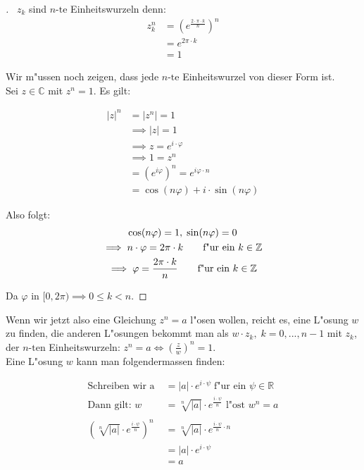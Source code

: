 \documentclass[11pt]{article}
\theoremstyle{remark}
\theoremstyle{definition}
\theoremstyle{remark}
\begin{document}
\begin{proof}[] \label{} \
\(z_k\) sind \(n\text{-te}\) Einheitswurzeln denn:
\begin{align*}
z_k^n & = (e^{\frac{2\cdot\pi\cdot k}{n}})^n \\ 
& = e^{2\pi\cdot k} \\
& = 1
\end{align*}


Wir m"ussen noch zeigen, dass jede \(n\text{-te}\) Einheitswurzel von dieser Form
ist. \\

Sei \(z\in\mathbb{C}\) mit \(z^n=1\). Es gilt:

\begin{align*}
|z|^n & =|z^n|=1 \\
& \implies |z|=1  \\
& \implies z=e^{i\cdot\varphi} \tag*{f"ur ein $\varphi\in[0, 2\pi)$}  \\ 
& \implies 1 = z^n \\
& = (e^{i\varphi})^n=e^{i\varphi\cdot n} \\
& =\cos(n\varphi)+i\cdot \sin(n\varphi)
\end{align*}

Also folgt:
\begin{gather*}
\cos(n\varphi)=1,\;\sin(n\varphi)=0 \\
\implies  n\cdot\varphi = 2\pi\cdot k \tag*{f"ur ein $k\in \mathbb{Z}$} \\ 
 \implies \varphi = \frac{2\pi\cdot k}{n} \tag*{f"ur ein $k\in \mathbb{Z}$}
\end{gather*}


Da \(\varphi\) in \([0,2\pi)\implies 0\leq k < n\).
\end{proof}

Wenn wir jetzt also eine Gleichung \(z^n=a\) l"osen wollen, reicht es, eine
L"osung \(w\) zu finden, die anderen L"osungen bekommt man als \(w\cdot z_k,\;
k=0,...,n-1\) mit \(z_k\), der \(n\text{-ten}\) Einheitswurzeln: \(z^n=a\iff
(\frac{z}{w})^n=1\).\\

Eine L"osung \(w\) kann man folgendermassen finden:
\begin{relation}


\begin{align*} 
\text{Schreiben wir a}\; & =|a|\cdot e^{i\cdot \psi}\; \text{f"ur ein $\psi\in \mathbb{R}$} \\
\text{Dann gilt: }
w & =\sqrt[n]{|a|}\cdot e^{\frac{i\cdot\psi}{n}} \text{ l"ost $w^n=a$} \\
& \\
\left(\sqrt[n]{|a|}\cdot e^{\frac{i\cdot\psi}{n}}\right)^n & = \sqrt[n]{|a|}\cdot e^{\frac{i\cdot\psi}{n}\cdot n} \\
& = |a|\cdot e^{i\cdot \psi} \\ 
& = a
\end{align*}
\end{relation}
\end{document}
